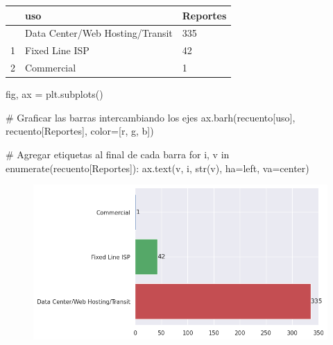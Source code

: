 \documentclass[
  letterpaper,
  DIV=11,
  numbers=noendperiod]{scrartcl}
\newenvironment{Shaded}{\begin{snugshade}}{\end{snugshade}}
\newcommand{\BuiltInTok}[1]{\textcolor[rgb]{0.00,0.23,0.31}{#1}}
\newcommand{\CommentTok}[1]{\textcolor[rgb]{0.37,0.37,0.37}{#1}}
\newcommand{\ControlFlowTok}[1]{\textcolor[rgb]{0.00,0.23,0.31}{#1}}
\newcommand{\KeywordTok}[1]{\textcolor[rgb]{0.00,0.23,0.31}{#1}}
\newcommand{\NormalTok}[1]{\textcolor[rgb]{0.00,0.23,0.31}{#1}}
\newcommand{\OperatorTok}[1]{\textcolor[rgb]{0.37,0.37,0.37}{#1}}
\newcommand{\StringTok}[1]{\textcolor[rgb]{0.13,0.47,0.30}{#1}}
\begin{document}
\begin{longtable}[]{@{}lll@{}}
\toprule\noalign{}
& uso & Reportes \\
\midrule\noalign{}
\endhead
\bottomrule\noalign{}
\endlastfoot
0 & Data Center/Web Hosting/Transit & 335 \\
1 & Fixed Line ISP & 42 \\
2 & Commercial & 1 \\
\end{longtable}

\begin{Shaded}
\begin{Highlighting}[]
\NormalTok{fig, ax }\OperatorTok{=}\NormalTok{ plt.subplots()}

\CommentTok{\# Graficar las barras intercambiando los ejes}
\NormalTok{ax.barh(recuento[}\StringTok{\textquotesingle{}uso\textquotesingle{}}\NormalTok{], recuento[}\StringTok{\textquotesingle{}Reportes\textquotesingle{}}\NormalTok{], color}\OperatorTok{=}\NormalTok{[}\StringTok{\textquotesingle{}r\textquotesingle{}}\NormalTok{, }\StringTok{\textquotesingle{}g\textquotesingle{}}\NormalTok{, }\StringTok{\textquotesingle{}b\textquotesingle{}}\NormalTok{])}

\CommentTok{\# Agregar etiquetas al final de cada barra}
\ControlFlowTok{for}\NormalTok{ i, v }\KeywordTok{in} \BuiltInTok{enumerate}\NormalTok{(recuento[}\StringTok{\textquotesingle{}Reportes\textquotesingle{}}\NormalTok{]):}
\NormalTok{    ax.text(v, i, }\BuiltInTok{str}\NormalTok{(v), ha}\OperatorTok{=}\StringTok{\textquotesingle{}left\textquotesingle{}}\NormalTok{, va}\OperatorTok{=}\StringTok{\textquotesingle{}center\textquotesingle{}}\NormalTok{)}
\end{Highlighting}
\end{Shaded}

\begin{figure}[H]

{\centering \includegraphics{Análisis_files/figure-pdf/cell-60-output-1.png}

}

\end{figure}
\end{document}

